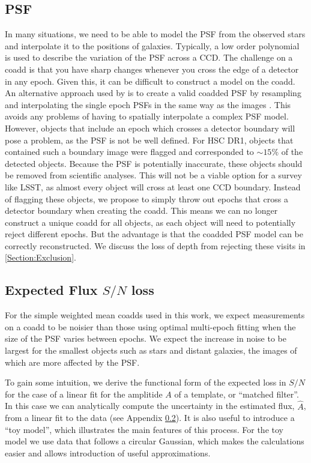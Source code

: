\documentclass[fleqn,useAMS,usenatbib]{mnras}
\begin{document}
\subsection{PSF}
\label{Subsection:PSF}
In many situations, we need to be able to model the PSF from the observed stars 
and interpolate it to the positions of galaxies.  Typically, a low order 
polynomial is used to describe the variation of the PSF across a CCD.  The 
challenge on a coadd is that you have sharp changes whenever you cross the edge 
of a detector in any epoch.  Given this, it can be difficult to construct a 
model on the coadd.  An alternative approach used by 
\cite{Jee2016,Mandelbaum2018} is to create a valid coadded PSF by resampling 
and interpolating the single epoch PSFs in the same way as the images 
\cite{DLS, HSC}.  This avoids any problems of having to spatially interpolate a 
complex PSF model.  However, objects that include an epoch which crosses a 
detector boundary will pose a problem, as the PSF is not be well defined.  For 
HSC DR1, objects that contained such a boundary image were flagged and 
corresponded to $\sim15\%$ of the detected objects.  Because the PSF is 
potentially inaccurate, these objects should be removed from scientific 
analyses.  This will not be a viable option for a survey like LSST, as almost 
every object will cross at least one CCD boundary.  Instead of flagging these 
objects, we propose to simply throw out epochs that cross a detector boundary 
when creating the coadd.  This means we can no longer construct a unique coadd 
for all objects, as each object will need to potentially reject different 
epochs.  But the advantage is that the coadded PSF model can be correctly 
reconstructed.  We discuss the loss of depth from rejecting these visits in 
\ref{Section:Exclusion}.

\subsection{Expected Flux $S/N$ loss}
\label{Subsection:FluxSN}

For the simple weighted mean coadds used in this work, we expect measurements
on a coadd to be noisier than those using optimal multi-epoch fitting when the
size of the PSF varies between epochs.  We expect the increase in noise to be
largest for the smallest objects such as stars and distant galaxies, the images
of which are more affected by the PSF.

To gain some intuition, we derive the functional form of the expected loss in
$S/N$ for the case of a linear fit for the amplitide $A$ of a template, or
``matched filter''.  In this case we can analytically compute the uncertainty
in the estimated flux, $\hat{A}$, from a linear fit to the data (see Appendix
\ref{Subsection:FluxSN}). It is also useful to introduce a ``toy model'', which
illustrates the main features of this process.  For the toy model we use data
that follows a circular Gaussian, which makes the calculations easier and
allows introduction of useful approximations.
\end{document}

